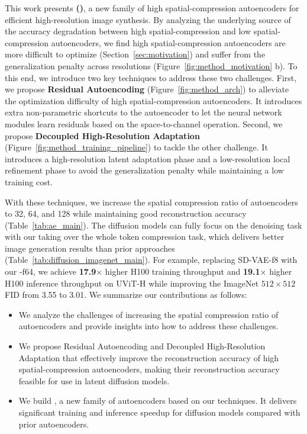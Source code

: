 This work presents \textbf{\modelfull (\modelshort)}, a new family of high spatial-compression autoencoders for efficient high-resolution image synthesis. By analyzing the underlying source of the accuracy degradation between high spatial-compression and low spatial-compression autoencoders, we find high spatial-compression autoencoders are more difficult to optimize (Section~\ref{sec:motivation}) and suffer from the generalization penalty across resolutions (Figure~\ref{fig:method_motivation} b). To this end, we introduce two key techniques to address these two challenges. First, we propose \textbf{Residual Autoencoding} (Figure~\ref{fig:method_arch}) to alleviate the optimization difficulty of high spatial-compression autoencoders. It introduces extra non-parametric shortcuts to the autoencoder to let the neural network modules learn residuals based on the space-to-channel operation. Second, we propose \textbf{Decoupled High-Resolution Adaptation} (Figure~\ref{fig:method_training_pipeline}) to tackle the other challenge. It introduces a high-resolution latent adaptation phase and a low-resolution local refinement phase to avoid the generalization penalty while maintaining a low training cost. 

With these techniques, we increase the spatial compression ratio of autoencoders to 32, 64, and 128 while maintaining good reconstruction accuracy (Table~\ref{tab:ae_main}). The diffusion models can fully focus on the denoising task with our \modelshort taking over the whole token compression task, which delivers better image generation results than prior approaches (Table~\ref{tab:diffusion_imagenet_main}). For example, replacing SD-VAE-f8 with our \modelshort-f64, we achieve \textbf{17.9$\times$} higher H100 training throughput and \textbf{19.1$\times$} higher H100 inference throughput on UViT-H \citep{bao2023all} while improving the ImageNet $512 \times 512$ FID from 3.55 to 3.01.  
We summarize our contributions as follows:

\vspace{-5pt}
\begin{itemize}[leftmargin=*]
\item We analyze the challenges of increasing the spatial compression ratio of autoencoders and provide insights into how to address these challenges.  
\item We propose Residual Autoencoding and Decoupled High-Resolution Adaptation that effectively improve the reconstruction accuracy of high spatial-compression autoencoders, making their reconstruction accuracy feasible for use in latent diffusion models. 
\item We build \modelshort, a new family of autoencoders based on our techniques. It delivers significant training and inference speedup for diffusion models compared with prior autoencoders. 
\end{itemize}




